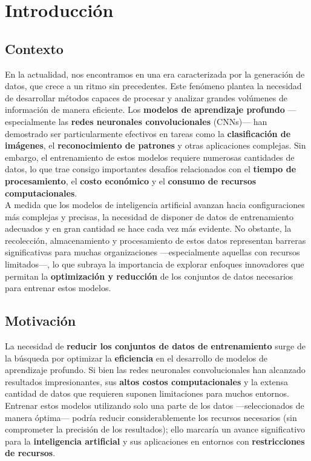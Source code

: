 \chapter{Introducción}\label{ch:introduccion}

\section{Contexto}\label{sec:contexto}
En la actualidad, nos encontramos en una era caracterizada por la generación de datos, que crece a un ritmo sin
precedentes.
Este fenómeno plantea la necesidad de desarrollar métodos capaces de procesar y analizar grandes volúmenes de
información de manera eficiente.
Los \textbf{modelos de aprendizaje profundo} —especialmente las \textbf{redes neuronales convolucionales} (CNNs)— han
demostrado ser particularmente efectivos en tareas como la \textbf{clasificación de imágenes}, el
\textbf{reconocimiento de patrones} y otras aplicaciones complejas.
Sin embargo, el entrenamiento de estos modelos requiere numerosas cantidades de datos, lo que trae consigo importantes
desafíos relacionados con el \textbf{tiempo de procesamiento}, el \textbf{costo económico} y el
\textbf{consumo de recursos computacionales}. \\[6pt]

A medida que los modelos de inteligencia artificial avanzan hacia configuraciones más complejas y precisas, la
necesidad de disponer de datos de entrenamiento adecuados y en gran cantidad se hace cada vez más evidente.
No obstante, la recolección, almacenamiento y procesamiento de estos datos representan barreras significativas para
muchas organizaciones —especialmente aquellas con recursos limitados—, lo que subraya la importancia de explorar
enfoques innovadores que permitan la \textbf{optimización y reducción} de los conjuntos de datos necesarios para
entrenar estos modelos. \\[6pt]

\section{Motivación}\label{sec:motivacion}
La necesidad de \textbf{reducir los conjuntos de datos de entrenamiento} surge de la búsqueda por optimizar la
\textbf{eficiencia} en el desarrollo de modelos de aprendizaje profundo.
Si bien las redes neuronales convolucionales han alcanzado resultados impresionantes, sus
\textbf{altos costos computacionales} y la extensa cantidad de datos que requieren suponen limitaciones para muchos
entornos.
Entrenar estos modelos utilizando solo una parte de los datos —seleccionados de manera óptima— podría reducir
considerablemente los recursos necesarios (sin comprometer la precisión de los resultados); ello marcaría un avance
significativo para la \textbf{inteligencia artificial} y sus aplicaciones en entornos con
\textbf{restricciones de recursos}. \\[6pt]

